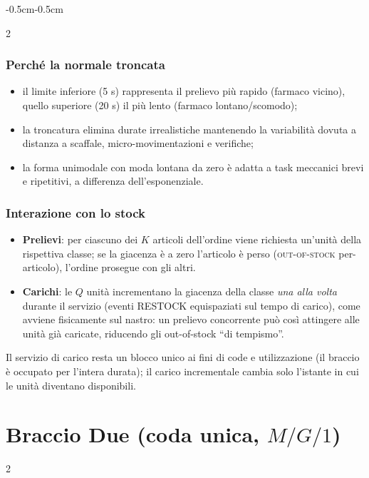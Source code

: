 \documentclass{article}
\newcommand{\beforesectiongap}{\vspace*{\baselineskip}}
\begin{document}
\begin{adjustwidth}{-0.5cm}{-0.5cm}
\begin{multicols}{2}
\subsubsection*{Perché la normale troncata}
\begin{itemize}
    \item il limite inferiore (5 s) rappresenta il prelievo più rapido (farmaco vicino), quello
    superiore (20 s) il più lento (farmaco lontano/scomodo);
    \item la troncatura elimina durate irrealistiche mantenendo la variabilità dovuta a distanza a
    scaffale, micro-movimentazioni e verifiche;
    \item la forma unimodale con moda lontana da zero è adatta a task meccanici brevi e
    ripetitivi, a differenza dell'esponenziale.
\end{itemize}

\subsubsection*{Interazione con lo stock}
\begin{itemize}
    \item \textbf{Prelievi}: per ciascuno dei $K$ articoli dell'ordine viene richiesta un'unità
    della rispettiva classe; se la giacenza è a zero l'articolo è perso (\textsc{out-of-stock}
    per-articolo), l'ordine prosegue con gli altri.
    \item \textbf{Carichi}: le $Q$ unità incrementano la giacenza della classe \emph{una alla
    volta} durante il servizio (eventi \textsc{RESTOCK} equispaziati sul tempo di carico), come
    avviene fisicamente sul nastro: un prelievo concorrente può così attingere alle unità già
    caricate, riducendo gli out-of-stock ``di tempismo''.
\end{itemize}
Il servizio di carico resta un blocco unico ai fini di code e utilizzazione (il braccio è occupato
per l'intera durata); il carico incrementale cambia solo l'istante in cui le unità diventano
disponibili.
\end{multicols}

\beforesectiongap
\newpage
\section*{Braccio Due (coda unica, $M/G/1$)}
\begin{multicols}{2}


\end{multicols}
\end{adjustwidth}
\end{document}
